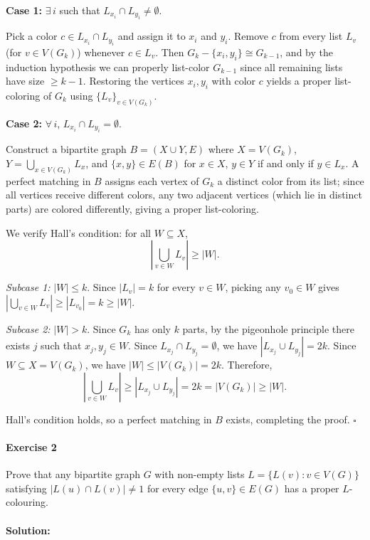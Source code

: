 \documentclass[a4paper,12pt]{article}
\newcommand{\card}[1]{\left| #1 \right|}
\begin{document}
\textbf{Case 1:} $\exists\, i$ such that $L_{x_i} \cap L_{y_i} \neq \emptyset$.

Pick a color $c \in L_{x_i} \cap L_{y_i}$ and assign it to $x_i$ and $y_i$. Remove $c$ from every list $L_v$ (for $v \in V(G_k)$) whenever $c \in L_v$. Then $G_k - \{x_i, y_i\} \cong G_{k-1}$, and by the induction hypothesis we can properly list-color $G_{k-1}$ since all remaining lists have size $\geq k - 1$. Restoring the vertices $x_i, y_i$ with color $c$ yields a proper list-coloring of $G_k$ using $\{L_v\}_{v \in V(G_k)}$.

\textbf{Case 2:} $\forall\, i$, $L_{x_i} \cap L_{y_i} = \emptyset$.

Construct a bipartite graph $B = (X \cup Y, E)$ where $X = V(G_k)$, $Y = \bigcup_{x \in V(G_k)} L_x$, and $\{x, y\} \in E(B)$ for $x \in X$, $y \in Y$ if and only if $y \in L_x$. A perfect matching in $B$ assigns each vertex of $G_k$ a distinct color from its list; since all vertices receive different colors, any two adjacent vertices (which lie in distinct parts) are colored differently, giving a proper list-coloring.

We verify Hall's condition: for all $W \subseteq X$,
\[
\left|\bigcup_{v \in W} L_v\right| \geq \card{W}.
\]

\textit{Subcase 1:} $\card{W} \leq k$. Since $\card{L_v} = k$ for every $v \in W$, picking any $v_0 \in W$ gives $\left|\bigcup_{v \in W} L_v\right| \geq \card{L_{v_0}} = k \geq \card{W}$.

\textit{Subcase 2:} $\card{W} > k$. Since $G_k$ has only $k$ parts, by the pigeonhole principle there exists $j$ such that $x_j, y_j \in W$. Since $L_{x_j} \cap L_{y_j} = \emptyset$, we have $\card{L_{x_j} \cup L_{y_j}} = 2k$. Since $W \subseteq X = V(G_k)$, we have $\card{W} \leq \card{V(G_k)} = 2k$. Therefore,
\[
\left|\bigcup_{v \in W} L_v\right| \geq \card{L_{x_j} \cup L_{y_j}} = 2k = \card{V(G_k)} \geq \card{W}.
\]

Hall's condition holds, so a perfect matching in $B$ exists, completing the proof. \hfill$\square$

\paragraph{Exercise 2}  Prove that any bipartite graph $G$ with non-empty lists $L = \{L(v) : v \in V(G) \}$ satisfying $\card{L(u) \cap L(v)} \neq 1$ for every edge $\{u,v\} \in E(G)$ has a proper $L$-colouring.

\paragraph{Solution:}
\end{document}
